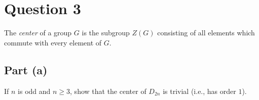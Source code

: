 \section{Question 3}

\begin{question}
    The \textit{center} of a group $G$ is the subgroup $Z(G)$ consisting of all elements which commute with every element of $G$.
\end{question}

\subsection{Part (a)}

\begin{question}
    If $n$ is odd and $n \geq 3$, show that the center of $D_{2n}$ is trivial (i.e., has order $1$).
\end{question}

